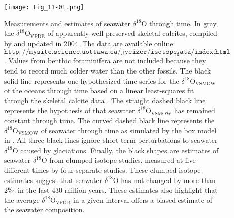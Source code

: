 \documentclass[5p, authoryear]{elsarticle}
\begin{document}
\begin{figure}[tb]
\centering
\texttt{[image: Fig\_11-01.png]}
\caption{Measurements and estimates of seawater $\delta^{18}$O through time. In gray, the $\delta^{18}$O$_{\text{VPDB}}$ of apparently well-preserved skeletal calcites, compiled by \cite{Veizer1999} and updated in 2004. The data are available online: $\mathtt{http://mysite.science.uottawa.ca/jveizer/isotope_data/index.html}$. Values from benthic foraminifera are not included because they tend to record much colder water than the other fossils. The black solid line represents one hypothesized time series for the $\delta^{18}$O$_{\text{VSMOW}}$ of the oceans through time based on a linear least-squares fit \citep{Veizer2000} through the skeletal calcite data \citep{Veizer1999}. The straight dashed black line represents the hypothesis of \cite{Gregory1981} that seawater $\delta^{18}$O$_{\text{VSMOW}}$ has remained constant through time. The curved dashed black line represents the $\delta^{18}$O$_{\text{VSMOW}}$ of seawater through time as simulated by the box model in \cite{Wallmann2001}. All three black lines ignore short-term perturbations to seawater $\delta^{18}$O caused by glaciations. Finally, the black shapes are estimates of seawater $\delta^{18}$O from clumped isotope studies, measured at five different times by four separate studies. These clumped isotope estimates suggest that seawater $\delta^{18}$O has not changed by more than 2$\permil$ in the last 430 million years. These estimates also highlight that the average $\delta^{18}$O$_{\text{VPDB}}$ in a given interval offers a biased estimate of the seawater composition.}
\label{Veizer}
\end{figure}
\end{document}
